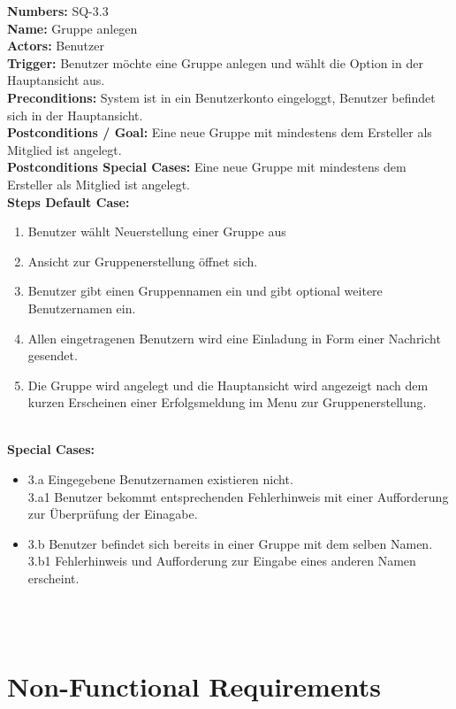 \documentclass{article}
\begin{document}
\begin{samepage}
\textbf{Numbers:} SQ-3.3\\
\textbf{Name:} Gruppe anlegen\\
\textbf{Actors:} Benutzer\\
\textbf{Trigger:} Benutzer möchte eine Gruppe anlegen und wählt die Option in der Hauptansicht aus.\\
\textbf{Preconditions:}  System ist in ein Benutzerkonto eingeloggt, Benutzer befindet sich in der Hauptansicht.\\
\textbf{Postconditions / Goal:} Eine neue Gruppe mit mindestens dem Ersteller als Mitglied ist angelegt.\\
\textbf{Postconditions Special Cases:} Eine neue Gruppe mit mindestens dem Ersteller als Mitglied ist angelegt. \\
\textbf{Steps Default Case:}
\begin{enumerate}
    \item Benutzer wählt Neuerstellung einer Gruppe aus
    \item Ansicht zur Gruppenerstellung öffnet sich.
    \item Benutzer gibt einen Gruppennamen ein und gibt optional weitere Benutzernamen ein.
    \item Allen eingetragenen Benutzern wird eine Einladung in Form einer Nachricht gesendet.
    \item Die Gruppe wird angelegt und die Hauptansicht wird angezeigt nach dem kurzen Erscheinen einer Erfolgsmeldung im Menu zur Gruppenerstellung.
\end{enumerate}\\
\textbf{Special Cases:}
\begin{itemize}
    \item 3.a Eingegebene Benutzernamen existieren nicht.\\
          3.a1 Benutzer bekommt entsprechenden Fehlerhinweis mit einer Aufforderung zur Überprüfung der Einagabe.\\
    \item 3.b Benutzer befindet sich bereits in einer Gruppe mit dem selben Namen. \\
          3.b1 Fehlerhinweis und Aufforderung zur Eingabe eines anderen Namen erscheint. \\
\end{itemize}\\
\\
\end{samepage}

\section{Non-Functional Requirements}
\end{document}
